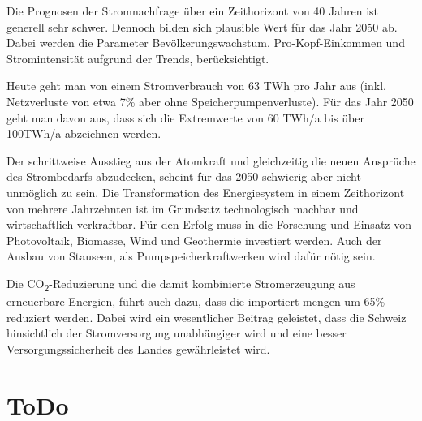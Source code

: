 Die Prognosen der Stromnachfrage über ein Zeithorizont von 40 Jahren ist generell sehr schwer\cite{eth_energiezukunft_schweiz}.
Dennoch bilden sich plausible Wert für das Jahr 2050 ab. Dabei werden die Parameter Bevölkerungswachstum,
Pro-Kopf-Einkommen und Stromintensität aufgrund der Trends, berücksichtigt.
\par
Heute geht man von einem Stromverbrauch von 63 TWh pro Jahr aus (inkl. Netzverluste von etwa 7\% aber
ohne Speicherpumpenverluste). Für das Jahr 2050 geht man davon aus, dass sich die Extremwerte von
60 TWh/a bis über 100TWh/a abzeichnen werden.
\par
Der schrittweise Ausstieg aus der Atomkraft und gleichzeitig die neuen Ansprüche des Strombedarfs abzudecken,
scheint für das 2050 schwierig aber nicht unmöglich zu sein. Die Transformation des Energiesystem in einem
Zeithorizont von mehrere Jahrzehnten ist im Grundsatz technologisch machbar und wirtschaftlich verkraftbar.
Für den Erfolg muss in die Forschung und Einsatz von Photovoltaik, Biomasse, Wind und Geothermie investiert werden.
Auch der Ausbau von Stauseen, als Pumpspeicherkraftwerken wird dafür nötig sein.
\par
Die CO\textsubscript{2}-Reduzierung und die damit kombinierte Stromerzeugung aus erneuerbare Energien, führt auch dazu,
dass die importiert mengen um 65\% reduziert werden. Dabei wird ein wesentlicher Beitrag geleistet, dass die Schweiz
hinsichtlich der Stromversorgung unabhängiger wird und eine besser  Versorgungssicherheit des Landes gewährleistet wird.
 



\section{ToDo}






